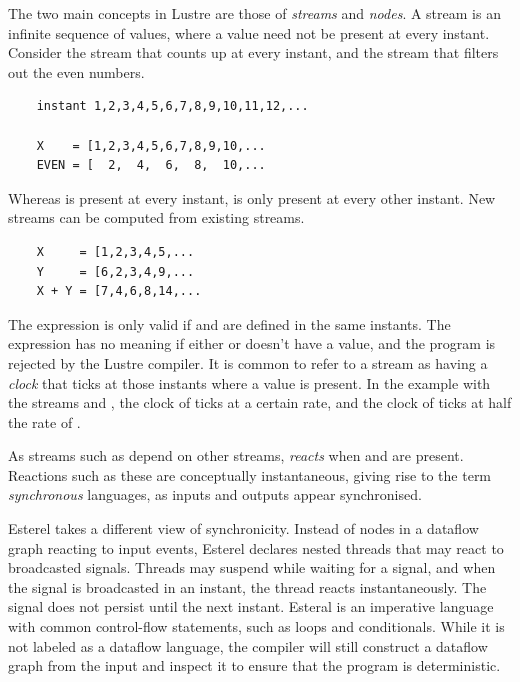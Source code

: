 The two main concepts in Lustre are those of \textit{streams} and \textit{nodes}. A stream is an infinite sequence of values,
where a value need not be present at every instant. Consider the stream  that counts up at every instant, and
the stream  that filters out the even numbers.

\begin{verbatim}
    instant 1,2,3,4,5,6,7,8,9,10,11,12,...

    X    = [1,2,3,4,5,6,7,8,9,10,...
    EVEN = [  2,  4,  6,  8,  10,...
\end{verbatim}

Whereas  is present at every instant,  is only present at every other instant. New streams can be computed
from existing streams.

\begin{verbatim}
    X     = [1,2,3,4,5,...
    Y     = [6,2,3,4,9,...
    X + Y = [7,4,6,8,14,...
\end{verbatim}

The expression  is only valid if  and  are defined in the same instants. The expression
 has no meaning if either  or  doesn't have a value, and the program is rejected by the Lustre
compiler. It is common to refer to a stream as having a \textit{clock} that ticks at those instants where a value is
present. In the example with the streams  and , the clock of  ticks at a certain rate, and
the clock of  ticks at half the rate of .

As streams such as  depend on other streams,  \textit{reacts} when  and  are
present. Reactions such as these are conceptually instantaneous, giving rise to the term \textit{synchronous} languages,
as inputs and outputs appear synchronised.

Esterel takes a different view of synchronicity. Instead of nodes in a dataflow graph reacting to input events, Esterel
declares nested threads that may react to broadcasted signals. Threads may suspend while waiting for a signal, and when
the signal is broadcasted in an instant, the thread reacts instantaneously. The signal does not persist until the next
instant. Esteral is an imperative language with common control-flow statements, such as loops and conditionals. While it
is not labeled as a dataflow language, the compiler will still construct a dataflow graph from the input and inspect it
to ensure that the program is deterministic.

